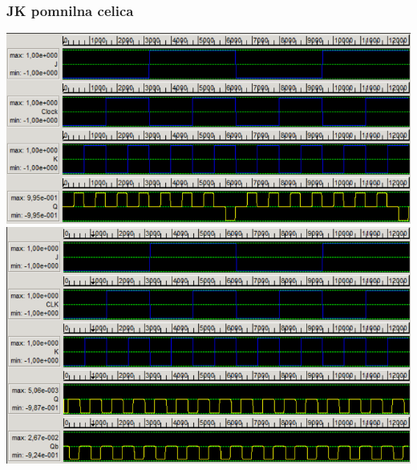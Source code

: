 \documentclass[a4paper, 11pt]{article}
\begin{document}
\subsubsection{JK pomnilna celica}
\includegraphics[scale=0.5]{../img/vir_4/sim_jk.png} \\
\includegraphics[scale=0.5]{../img/vir_5/sim_jk.png}
\end{document}
